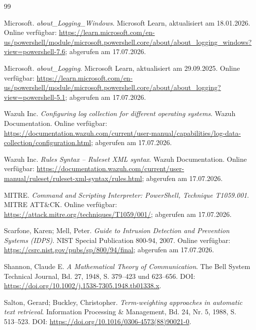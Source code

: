 \documentclass[12pt,a4paper,oneside,parskip=half]{scrreprt}
\begin{document}
\clearpage
{}
{}
\begin{thebibliography}{99}

Microsoft. \emph{about\_Logging\_Windows}. Microsoft Learn, aktualisiert am 18.01.2026. Online verfügbar: \url{https://learn.microsoft.com/en-us/powershell/module/microsoft.powershell.core/about/about_logging_windows?view=powershell-7.6}; abgerufen am 17.07.2026.

Microsoft. \emph{about\_Logging}. Microsoft Learn, aktualisiert am 29.09.2025. Online verfügbar: \url{https://learn.microsoft.com/en-us/powershell/module/microsoft.powershell.core/about/about_logging?view=powershell-5.1}; abgerufen am 17.07.2026.

Wazuh Inc. \emph{Configuring log collection for different operating systems}. Wazuh Documentation. Online verfügbar: \url{https://documentation.wazuh.com/current/user-manual/capabilities/log-data-collection/configuration.html}; abgerufen am 17.07.2026.

Wazuh Inc. \emph{Rules Syntax -- Ruleset XML syntax}. Wazuh Documentation. Online verfügbar: \url{https://documentation.wazuh.com/current/user-manual/ruleset/ruleset-xml-syntax/rules.html}; abgerufen am 17.07.2026.

MITRE. \emph{Command and Scripting Interpreter: PowerShell, Technique T1059.001}. MITRE ATT\&CK. Online verfügbar: \url{https://attack.mitre.org/techniques/T1059/001/}; abgerufen am 17.07.2026.

Scarfone, Karen; Mell, Peter. \emph{Guide to Intrusion Detection and Prevention Systems (IDPS)}. NIST Special Publication 800-94, 2007. Online verfügbar: \url{https://csrc.nist.gov/pubs/sp/800/94/final}; abgerufen am 17.07.2026.

Shannon, Claude E. \emph{A Mathematical Theory of Communication}. The Bell System Technical Journal, Bd. 27, 1948, S. 379--423 und 623--656. DOI: \url{https://doi.org/10.1002/j.1538-7305.1948.tb01338.x}.

Salton, Gerard; Buckley, Christopher. \emph{Term-weighting approaches in automatic text retrieval}. Information Processing \& Management, Bd. 24, Nr. 5, 1988, S. 513--523. DOI: \url{https://doi.org/10.1016/0306-4573(88)90021-0}.


\end{thebibliography}
\end{document}
